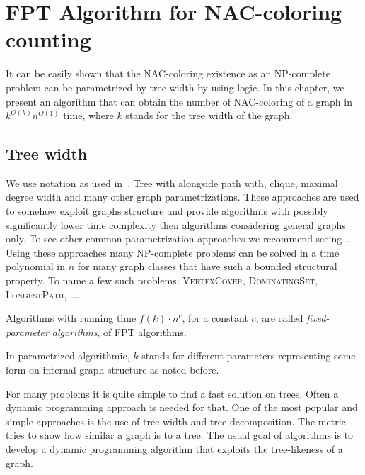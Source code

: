 \chapter{FPT Algorithm for NAC-coloring counting}

\begin{chapterabstract}

	It can be easily shown that the NAC-coloring existence as an NP-complete
	problem can be parametrized by tree width by using \MSO{} logic.
	In this chapter, we present an algorithm that can obtain
	the number of NAC-coloring of a graph in \({k}^{O(k)} n^{O(1)}\) time,
	where \(k\) stands for the tree width of the graph.

\end{chapterabstract}

\section{Tree width}

We use notation as used in~\cite{book_parametrized_algorithms}.
Tree with alongside path with, clique, maximal degree width
and many other graph parametrizations.
These approaches are used to somehow exploit graphs structure
and provide algorithms with possibly significantly lower time complexity
then algorithms considering general graphs only.
To see other common parametrization approaches
we recommend seeing~\cite{tree_width_comparision_other_classes}.
Using these approaches many NP-complete problems can be solved
in a time polynomial in \( n \)
for many graph classes that have such a bounded structural property.
To name a few such problems:
\textsc{VertexCover}, \textsc{DominatingSet}, \textsc{LongestPath}, \dots.

%
\begin{definition}
	Algorithms with running time \( f(k)\cdot n^c \), for a constant \( c \),
	are called \emph{fixed-parameter algorithms}, of FPT algorithms.
\end{definition}
%
In parametrized algorithmic, \( k \) stands for different parameters
representing some form on internal graph structure as noted before.

For many problems it is quite simple to find a fast solution on trees.
Often a dynamic programming approach is needed for that.
%
One of the most popular and simple approaches
is the use of tree width and tree decomposition.
The metric tries to show how similar a graph is to a tree.
%
The usual goal of algorithms is to develop a dynamic programming algorithm
that exploits the tree-likeness of a graph.

